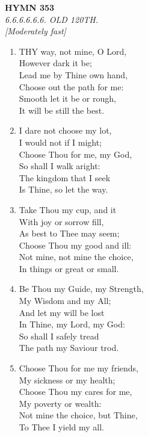 \newpage
\begin{center}
    {\Large \textbf{HYMN 353}}
    \\
    \textit{6.6.6.6.6.6. OLD 120TH.}
    \\
    \textit{\small [Moderately fast]}
\end{center}
\vspace{1em}

\begin{enumerate}
    \item THY way, not mine, O Lord, \\
        However dark it be; \\
        Lead me by Thine own hand, \\
        Choose out the path for me: \\
        Smooth let it be or rough, \\
        It will be still the best.

    \item I dare not choose my lot, \\
        I would not if I might; \\
        Choose Thou for me, my God, \\
        So shall I walk aright: \\
        The kingdom that I seek \\
        Is Thine, so let the way.

    \item Take Thou my cup, and it \\
        With joy or sorrow fill, \\
        As best to Thee may seem; \\
        Choose Thou my good and ill: \\
        Not mine, not mine the choice, \\
        In things or great or small.

    \item Be Thou my Guide, my Strength, \\
        My Wisdom and my All; \\
        And let my will be lost \\
        In Thine, my Lord, my God: \\
        So shall I safely tread \\
        The path my Saviour trod.

    \item Choose Thou for me my friends, \\
        My sickness or my health; \\
        Choose Thou my cares for me, \\
        My poverty or wealth: \\
        Not mine the choice, but Thine, \\
        To Thee I yield my all.


\end{enumerate}
